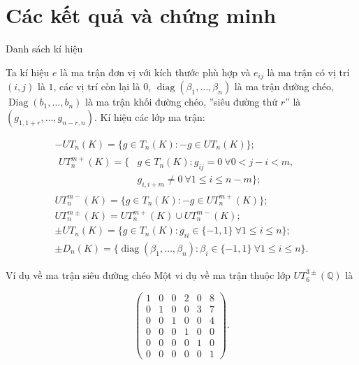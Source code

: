 \documentclass[11pt, aspectratio=169]{beamer}
\theoremstyle{plain}
\theoremstyle{definition}
\theoremstyle{remark}
\DeclareMathOperator{\diag}{diag}
\DeclareMathOperator{\Diag}{Diag}
\begin{document}
\section{Các kết quả và chứng minh}

\begin{frame}{Danh sách kí hiệu}

Ta kí hiệu \( e \) là ma trận đơn vị với kích thước phù hợp và \( e_{ij} \) là ma trận có vị trí \( (i,j) \) là \( 1 \), các vị trí còn lại là \( 0 \), \( \diag (\beta_1, \dots, \beta_n) \) là ma trận đường chéo, \( \Diag (b_1, \dots, b_n) \) là ma trận khối đường chéo, ''siêu đường thứ \( r \)'' là \( (g_{1, 1 + r}, \dots, g_{n - r, n}) \). Kí hiệu các lớp ma trận:

\begin{gather*}
    -UT_n(K) = \{ g \in T_n(K): -g \in UT_n(K) \}; \\
    \begin{aligned}
    UT_n^{m+}(K) = \{ & g \in T_n(K): g_{ij} = 0 ~\forall 0<j-i<m, \\ & g_{i,i+m} \neq 0 ~\forall 1 \le i \le n - m \};
    \end{aligned} \\
    UT_n^{m-}(K) = \{ g \in  T_n(K): -g \in UT_n^{m+}(K) \}; \\
    UT_n^{m\pm}(K) = UT_n^{m+}(K) \cup UT_n^{m-}(K); \\
    \pm UT_n(K) = \{ g \in  T_n(K): g_{ii} \in \{ -1, 1 \} ~\forall 1 \le i \le n \}; \\
    \pm D_n(K) = \{ \diag(\beta_1, \dots, \beta_n): \beta_i \in \{ -1, 1 \} ~\forall 1 \le i \le n \}.
\end{gather*}

\end{frame}

\begin{frame}{Ví dụ về ma trận siêu đường chéo}
    Một vi dụ về ma trận thuộc lớp \( UT_6^{3 \pm}(\mathbb{Q}) \) là

    \[
        \begin{pmatrix}
            1 &0 &0 &2 &0 &8 \\
            0 &1 &0 &0 &3 &7 \\
            0 &0 &1 &0 &0 &4 \\
            0 &0 &0 &1 &0 & 0 \\
            0 &0 &0 &0 &1 &0 \\
            0 &0 &0 &0 &0 &1
        \end{pmatrix}.
    \]
\end{frame}
\end{document}
